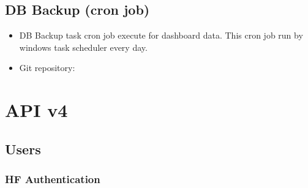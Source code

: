 \documentclass[letterpaper,10pt,english,openany,oneside]{sphinxmanual}
\begin{document}
\section{DB Backup (cron job)}
\label{\detokenize{Third Party/data-export-tool:db-backup-cron-job}}\begin{itemize}
\item {} 
\sphinxAtStartPar
DB Backup task cron job execute  for dashboard data. This cron job run by windows task scheduler every day.

\item {} 
\sphinxAtStartPar
Git repository: 

\end{itemize}


\chapter{API v4}
\label{\detokenize{api/v4:api-v4}}\label{\detokenize{api/v4::doc}}

\section{Users}
\label{\detokenize{api/v4:users}}

\subsection{HF Authentication}
\label{\detokenize{api/v4:hf-authentication}}
\end{document}

